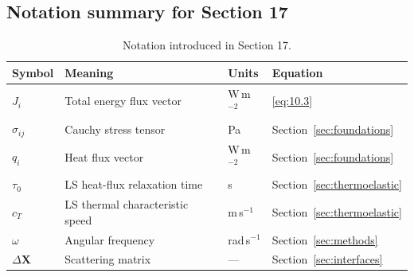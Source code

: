 \subsection{Notation summary for Section 17}

\begin{table}[htbp]
\centering
\small
\caption{Notation introduced in Section 17.}
\label{tab:notation-sec17}
\begin{tabularx}{\textwidth}{@{}p{1.8cm}X p{2.2cm}p{2.1cm}@{}}
\toprule
\textbf{Symbol} & \textbf{Meaning} & \textbf{Units} & \textbf{Equation} \\
\midrule
$J_i$ & Total energy flux vector & W\,m$^{-2}$ & \eqref{eq:10.3} \\
$\sigma_{ij}$ & Cauchy stress tensor & Pa & Section~\ref{sec:foundations} \\
$q_i$ & Heat flux vector & W\,m$^{-2}$ & Section~\ref{sec:foundations} \\
$\tau_0$ & LS heat-flux relaxation time & s & Section~\ref{sec:thermoelastic} \\
$c_T$ & LS thermal characteristic speed & m\,s$^{-1}$ & Section~\ref{sec:thermoelastic} \\
$\omega$ & Angular frequency & rad\,s$^{-1}$ & Section~\ref{sec:methods} \\
$\Delta\bm{X}$ & Scattering matrix & --- & Section~\ref{sec:interfaces} \\
\bottomrule
\end{tabularx}
\end{table}
